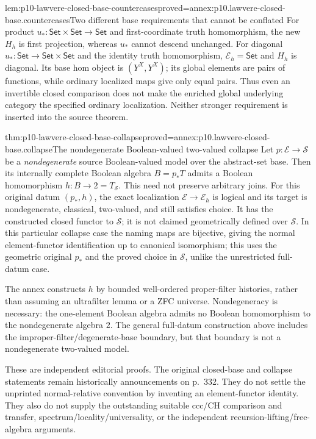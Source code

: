 \begin{hblemma}{lem:p10-lawvere-closed-base-countercases}{proved=annex:p10.lawvere-closed-base.countercases}{Two different base requirements that cannot be conflated}
For product \(u_*:\mathsf{Set}\times\mathsf{Set}\to\mathsf{Set}\)
and first-coordinate truth homomorphism, the new \(H_h\) is first
projection, whereas \(u_*\) cannot descend unchanged.
For diagonal \(u_*:\mathsf{Set}\to\mathsf{Set}\times\mathsf{Set}\)
and the identity truth homomorphism, \(\mathcal E_h=\mathsf{Set}\)
and \(H_h\) is diagonal. Its base hom object is
\((Y^X,Y^X)\); its global elements are pairs of functions, while
ordinary localized maps give only equal pairs. Thus even an invertible
closed comparison does not make the enriched global underlying category
the specified ordinary localization. Neither stronger requirement is
inserted into the source theorem.
\end{hblemma}

\begin{hbtheorem}{thm:p10-lawvere-closed-base-collapse}{proved=annex:p10.lawvere-closed-base.collapse}{The nondegenerate Boolean-valued two-valued collapse}
Let \(p:\mathcal E\to\mathcal S\) be a \emph{nondegenerate}
source Boolean-valued model over the abstract-set base. Then its internally
complete Boolean algebra \(B=p_*T\) admits a Boolean homomorphism
\(h:B\to2=T_{\mathcal S}\). This need not preserve arbitrary joins.
For this original datum \((p_*,h)\), the exact localization
\(\mathcal E\to\mathcal E_h\) is logical and its target is
nondegenerate, classical, two-valued, and still satisfies choice.
It has the constructed closed functor to \(\mathcal S\); it is
not claimed geometrically defined over \(\mathcal S\). In this
particular collapse case the naming maps are bijective, giving the
normal element-functor identification up to canonical isomorphism;
this uses the geometric original \(p_*\) and the proved choice
in \(\mathcal S\), unlike the unrestricted full-datum case.

The annex constructs \(h\) by bounded well-ordered proper-filter
histories, rather than assuming an ultrafilter lemma or a ZFC universe.
Nondegeneracy is necessary: the one-element Boolean algebra admits no
Boolean homomorphism to the nondegenerate algebra \(2\). The general
full-datum construction above includes the improper-filter/degenerate-base
boundary, but that boundary is not a nondegenerate two-valued model.
\end{hbtheorem}

These are independent editorial proofs. The original closed-base and
collapse statements remain historically announcements on p.~332. They
do not settle the unprinted normal-relative convention by inventing an
element-functor identity. They also do not supply the outstanding suitable
ccc/CH comparison and transfer, spectrum/locality/universality, or the
independent recursion-lifting/free-algebra arguments.
